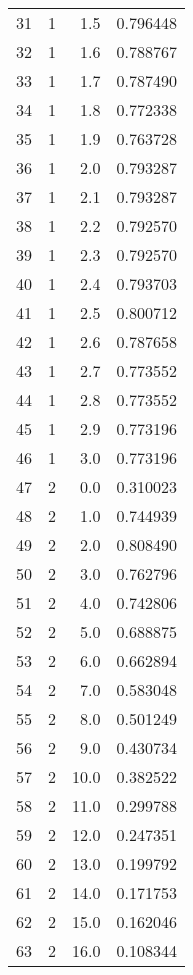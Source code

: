 \begin{tabular}{lrrr}
31  &        1 &      1.5 &  0.796448 \\
32  &        1 &      1.6 &  0.788767 \\
33  &        1 &      1.7 &  0.787490 \\
34  &        1 &      1.8 &  0.772338 \\
35  &        1 &      1.9 &  0.763728 \\
36  &        1 &      2.0 &  0.793287 \\
37  &        1 &      2.1 &  0.793287 \\
38  &        1 &      2.2 &  0.792570 \\
39  &        1 &      2.3 &  0.792570 \\
40  &        1 &      2.4 &  0.793703 \\
41  &        1 &      2.5 &  0.800712 \\
42  &        1 &      2.6 &  0.787658 \\
43  &        1 &      2.7 &  0.773552 \\
44  &        1 &      2.8 &  0.773552 \\
45  &        1 &      2.9 &  0.773196 \\
46  &        1 &      3.0 &  0.773196 \\
47  &        2 &      0.0 &  0.310023 \\
48  &        2 &      1.0 &  0.744939 \\
49  &        2 &      2.0 &  0.808490 \\
50  &        2 &      3.0 &  0.762796 \\
51  &        2 &      4.0 &  0.742806 \\
52  &        2 &      5.0 &  0.688875 \\
53  &        2 &      6.0 &  0.662894 \\
54  &        2 &      7.0 &  0.583048 \\
55  &        2 &      8.0 &  0.501249 \\
56  &        2 &      9.0 &  0.430734 \\
57  &        2 &     10.0 &  0.382522 \\
58  &        2 &     11.0 &  0.299788 \\
59  &        2 &     12.0 &  0.247351 \\
60  &        2 &     13.0 &  0.199792 \\
61  &        2 &     14.0 &  0.171753 \\
62  &        2 &     15.0 &  0.162046 \\
63  &        2 &     16.0 &  0.108344 \\

\end{tabular}
